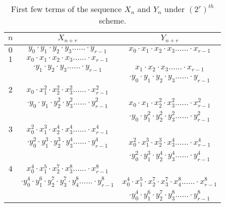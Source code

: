 \begin{table}[H]
\begin{center}
\begin{tabular}{ccc}
  \hline
 $ n$ & $X_{n+r}$ &$ Y_{n+r}$\\
  \hline
  $0$ & $y_{0}\cdot y_{1}\cdot y_{2}\cdot y_{3}......\cdot y_{r-1} $& $x_{0}\cdot x_{1}\cdot x_{2}\cdot x_{3}......\cdot x_{r-1} $\\
	\hline
  $1$ & $x_{0}\cdot x_{1}\cdot x_{2}\cdot x_{3}......\cdot x_{r-1}$\\&$\cdot y_{1}\cdot y_{2}\cdot y_{3}......\cdot y_{r-1}$ &$ x_{1}\cdot x_{2}\cdot x_{3}......\cdot x_{r-1}$\\&&$\cdot y_{0}\cdot y_{1}\cdot y_{2}\cdot y_{3}......\cdot y_{r-1} $\\
	\hline
  $2$ &$ x_{0}\cdot x_{1}^2\cdot x_{2}^2\cdot x_{3}^2......\cdot x_{r-1}^2$\\&$\cdot y_{0}\cdot y_{1}\cdot y_{2}^2\cdot y_{3}^2......\cdot y_{r-1}^2$ &$ x_{0}\cdot x_{1}\cdot x_{2}^2\cdot x_{3}^2......\cdot x_{r-1}^2$\\&&$\cdot y_{0}\cdot y_{1}^2\cdot y_{2}^2\cdot y_{3}^2......\cdot y_{r-1}^2$ \\
	\hline
  $3$ &$x_{0}^2\cdot x_{1}^3\cdot x_{2}^4\cdot x_{3}^4......\cdot x_{r-1}^4$\\&$\cdot y_{0}^2\cdot y_{1}^3\cdot y_{2}^3\cdot y_{3}^4......\cdot y_{r-1}^4 $&$ x_{0}^2\cdot x_{1}^3\cdot x_{2}^3\cdot x_{3}^4......\cdot x_{r-1}^4$\\&&$\cdot y_{0}^2\cdot y_{1}^3\cdot y_{2}^4\cdot y_{3}^4......\cdot y_{r-1}^4$\\
	\hline
  $4 $&$ x_{0}^4\cdot x_{1}^5\cdot x_{2}^7\cdot x_{3}^8......\cdot x_{r-1}^8$\\&$\cdot y_{0}^4\cdot y_{1}^6\cdot y_{2}^7\cdot y_{3}^7\cdot y_{4}^8......\cdot y_{r-1}^8$ & $x_{0}^4\cdot x_{1}^5\cdot x_{2}^7\cdot x_{3}^7\cdot x_{4}^8......\cdot x_{r-1}^8$\\&&$\cdot y_{0}^4\cdot y_{1}^6\cdot y_{2}^7\cdot y_{3}^8......\cdot y_{r-1}^8$ \\
  \hline
\end{tabular}
\end{center}
\caption{First few terms of the sequence $X_n$ and $Y_n$ under $(2^r)^{th}$ scheme.}
\end{table}
